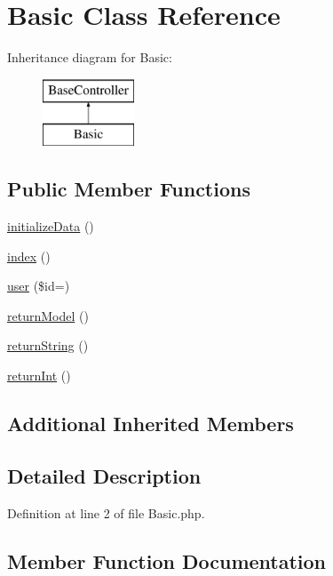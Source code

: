 \hypertarget{class_basic}{}\section{Basic Class Reference}
\label{class_basic}
Inheritance diagram for Basic\+:\begin{figure}[H]
\begin{center}
\leavevmode
\includegraphics[height=2.000000cm]{class_basic}
\end{center}
\end{figure}
\subsection*{Public Member Functions}
\begin{DoxyCompactItemize}
\item 
\hyperlink{class_basic_a9d1fa71862cb93e3a2e89806c32520a5}{initialize\+Data} ()
\item 
\hyperlink{class_basic_ac7cd2823d250de784f74ff852972e269}{index} ()
\item 
\hyperlink{class_basic_a64bf4d807057c1060a0f402c2cbe4fef}{user} (\$id=\textquotesingle{}\textquotesingle{})
\item 
\hyperlink{class_basic_a68b47cdce3c867df841f6a29b8de624b}{return\+Model} ()
\item 
\hyperlink{class_basic_a00d093f162848a1bd2e6e48d7cd68ab0}{return\+String} ()
\item 
\hyperlink{class_basic_ade94a138ee91270bc419445603df2ec7}{return\+Int} ()
\end{DoxyCompactItemize}
\subsection*{Additional Inherited Members}


\subsection{Detailed Description}


Definition at line 2 of file Basic.\+php.



\subsection{Member Function Documentation}
\hypertarget{class_basic_ac7cd2823d250de784f74ff852972e269}{}\label{class_basic_ac7cd2823d250de784f74ff852972e269} 
